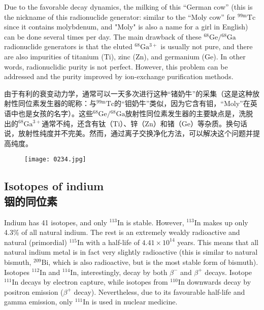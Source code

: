 \documentclass[dvipsnames, svgnames,a4paper,11pt]{article}
\begin{document}
Due to the favorable decay dynamics, the milking of this “German cow” (this is the nickname of this radionuclide generator: similar to the “Moly cow” for \(\mathrm{^{99m}Tc}\) since it contains molybdenum, and "Moly" is also a name for a girl in English) can be done several times per day. The main drawback of these \(\mathrm{^{68}Ge}/\mathrm{^{68}Ga}\) radionuclide generators is that the eluted \(\mathrm{^{68}Ga^{3+}}\) is usually not pure, and there are also impurities of titanium (\(\mathrm{Ti}\)), zinc (\(\mathrm{Zn}\)), and germanium (\(\mathrm{Ge}\)). In other words, radionuclidic purity is not perfect. However, this problem can be addressed and the purity improved by ion-exchange purification methods.

由于有利的衰变动力学，通常可以一天多次进行这种“锗奶牛”的采集（这是这种放射性同位素发生器的昵称：与\(\mathrm{^{99m}Tc}\)的“钼奶牛”类似，因为它含有钼，“Moly”在英语中也是女孩的名字）。这些\(\mathrm{^{68}Ge}/\mathrm{^{68}Ga}\)放射性同位素发生器的主要缺点是，洗脱出的\(\mathrm{^{68}Ga^{3+}}\)通常不纯，还含有钛（\(\mathrm{Ti}\)）、锌（\(\mathrm{Zn}\)）和锗（\(\mathrm{Ge}\)）等杂质。换句话说，放射性纯度并不完美。然而，通过离子交换净化方法，可以解决这个问题并提高纯度。

\begin{figure}[h]
	\centering
    \texttt{[image: 0234.jpg]}  
     \label{fig311}
\end{figure}

\subsection{Isotopes of indium\\ 铟的同位素}  
Indium has 41 isotopes, and only \(\mathrm{^{113}In}\) is stable. However, \(\mathrm{^{113}In}\) makes up only 4.3\% of all natural indium. The rest is an extremely weakly radioactive and natural (primordial) \(\mathrm{^{115}In}\) with a half-life of \(4.41 \times 10^{14}\) years. This means that all natural indium metal is in fact very slightly radioactive (this is similar to natural bismuth, \(\mathrm{^{209}Bi}\), which is also radioactive, but is the most stable form of bismuth). Isotopes \(\mathrm{^{112}In}\) and \(\mathrm{^{114}In}\), interestingly, decay by both \(\beta^-\) and \(\beta^+\) decays. Isotope \(\mathrm{^{111}In}\) decays by electron capture, while isotopes from \(\mathrm{^{110}In}\) downwards decay by positron emission (\(\beta^+\) decay). Nevertheless, due to its favourable half-life and gamma emission, only \(\mathrm{^{111}In}\) is used in nuclear medicine.
\end{document}
